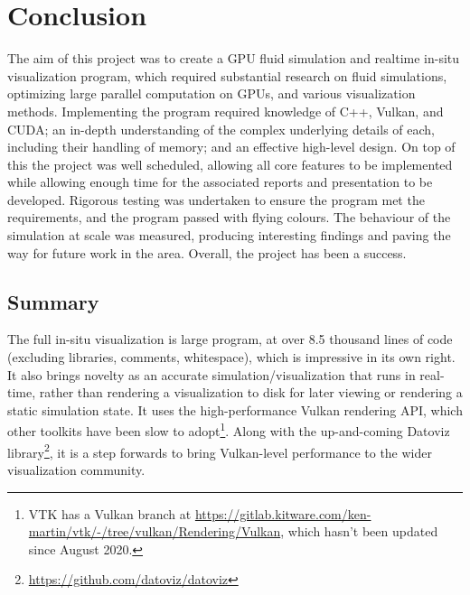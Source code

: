 
\chapter{Conclusion}
\label{sec:Conclusion} 





The aim of this project was to create a GPU fluid simulation and realtime in-situ visualization program, which required substantial research on fluid simulations, optimizing large parallel computation on GPUs, and various visualization methods.
Implementing the program required knowledge of C++, Vulkan, and CUDA; an in-depth understanding of the complex underlying details of each, including their handling of memory; and an effective high-level design.
On top of this the project was well scheduled, allowing all core features to be implemented while allowing enough time for the associated reports and presentation to be developed.
Rigorous testing was undertaken to ensure the program met the requirements, and the program passed with flying colours.
The behaviour of the simulation at scale was measured, producing interesting findings and paving the way for future work in the area.
Overall, the project has been a success.

\section{Summary}
The full in-situ visualization is large program, at over 8.5 thousand lines of code (excluding libraries, comments, whitespace), which is impressive in its own right.
It also brings novelty as an accurate simulation/visualization that runs in real-time, rather than rendering a visualization to disk for later viewing or rendering a static simulation state.
It uses the high-performance Vulkan rendering API, which other toolkits have been slow to adopt\footnote{VTK has a Vulkan branch at \url{https://gitlab.kitware.com/ken-martin/vtk/-/tree/vulkan/Rendering/Vulkan}, which hasn't been updated since August 2020.}.
Along with the up-and-coming Datoviz library\footnote{\url{https://github.com/datoviz/datoviz}}, it is a step forwards to bring Vulkan-level performance to the wider visualization community.

